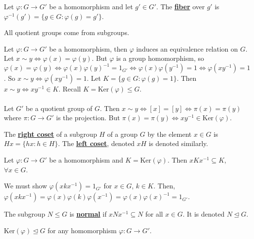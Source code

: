 \documentclass[11pt,letterpaper]{book}
\newcommand{\define}[1]{\underline{\textbf{#1}}}
\newcommand{\hmap}[3][\varphi]{%
    #1:#2\rightarrow#3}
\theoremstyle{definition}
\begin{document}
\begin{defi}
    Let $\hmap{G}{G'}$ be a homomorphism and let $g'\in G'$. The \define{fiber} over $g'$ is $\varphi^{-1}(g')=\{g\in G:\varphi(g)=g'\}$.
\end{defi}

\begin{bprop}
    All quotient groups come from subgroups.
\end{bprop}

\begin{bpf}
    Let $\hmap{G}{G'}$ be a homomorphism, then $\varphi$ induces an equivalence relation on $G$. Let $x\sim y\Leftrightarrow\varphi(x)=\varphi(y)$. But $\varphi$ is a group homomorphism, so $\varphi(x)=\varphi(y)\Leftrightarrow\varphi(x)\varphi(y)^{-1}=1_{G'}\Leftrightarrow\varphi(x)\varphi(y^{-1})=1\Leftrightarrow\varphi(xy^{-1})=1$. So $x\sim y\Leftrightarrow\varphi(xy^{-1})=1$. Let $K=\{g\in G:\varphi(g)=1\}$. Then $x\sim y\Leftrightarrow xy^{-1}\in K$. Recall $K=\text{Ker}(\varphi)\le G$.\\\\
    Let $G'$ be a quotient group of $G$. Then $x\sim y\Leftrightarrow[x]=[y]\Leftrightarrow\pi(x)=\pi(y)$ where $\hmap[\pi]{G}{G'}$ is the projection. But $\pi(x)=\pi(y)\Leftrightarrow xy^{-1}\in\text{Ker}(\varphi)$.
\end{bpf}

\begin{defi}
    The \define{right coset} of a subgroup $H$ of a group $G$ by the element $x\in G$ is $Hx=\{hx:h\in H\}$. The \define{left coset}, denoted $xH$ is denoted similarly.
\end{defi}

\begin{prop}
    Let $\hmap{G}{G'}$ be a homomorphism and $K=\text{Ker}(\varphi)$. Then $xKx^{-1}\subseteq K$, $\forall x\in G$.
\end{prop}

\begin{pf}
    We must show $\varphi(xkx^{-1})=1_{G'}$ for $x\in G$, $k\in K$. Then, $\varphi(xkx^{-1})=\varphi(x)\varphi(k)\varphi(x^{-1})=\varphi(x)\varphi(x)^{-1}=1_{G'}$.
\end{pf}

\begin{bdefi}
    The subgroup $N\le G$ is \define{normal} if $xNx^{-1}\subseteq N$ for all $x\in G$. It is denoted $N\unlhd G$.
\end{bdefi}

\begin{prop}
    $\text{Ker}(\varphi)\unlhd G$ for any homomorphism $\hmap{G}{G'}$.
\end{prop}
\end{document}
